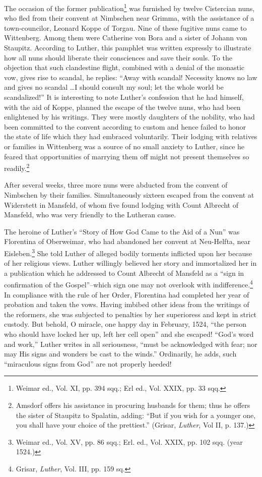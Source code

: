 The occasion of the former publication\footnote
{Weimar ed., Vol. XI, pp. 394 sqq.; Erl ed., Vol. XXIX, pp. 33 sqq.}
was furnished by twelve
Cistercian nuns, who fled from their convent at Nimbschen near
Grimma, with the assistance of a town-councilor, Leonard Koppe of
Torgau. Nine of these fugitive nuns came to Wittenberg. Among
them were Catherine von Bora and a sister of Johann von Staupitz.
According to Luther, this pamphlet was written expressly to illustrate
how all nuns should liberate their consciences and save their
souls. To the objection that such clandestine flight, combined with
a denial of the monastic vow, gives rise to scandal, he replies: “Away
with scandal! Necessity knows no law and gives no scandal \dots I
should consult my soul; let the whole world be scandalized!” It
is interesting to note Luther’s confession that he had himself, with
the aid of Koppe, planned the escape of the twelve nuns, who had
been enlightened by his writings. They were mostly daughters of
the nobility, who had been committed to the convent according to
custom and hence failed to honor the state of life which they had
embraced voluntarily. Their lodging with relatives or families in
Wittenberg was a source of no small anxiety to Luther, since he
feared that opportunities of marrying them off might not present
themselves so readily.\footnote
{Amsdorf offers his assistance in procuring husbands for them; thus he offers the sister
of Staupitz to Spalatin, adding: “But if you wish for a younger one, you shall have your
choice of the prettiest.” (Grisar, \textit{Luther}, Vol II, p. 137.)}

After several weeks, three more nuns were abducted from the
convent of Nimbschen by their families. Simultaneously sixteen
escaped from the convent at Widerstett in Mansfeld, of whom five
found lodging with Count Albrecht of Mansfeld, who was very
friendly to the Lutheran cause.

The heroine of Luther’s “Story of How God Came to the Aid of
a Nun” was Florentina of Oberweimar, who had abandoned her
convent at Neu-Helfta, near Eisleben.\footnote{Weimar ed., Vol. XV, pp. 86 sqq.; Erl. ed., Vol. XXIX, pp. 102 sqq. (year 1524.)}
She told Luther of alleged
bodily torments inflicted upon her because of her religious views.
Luther willingly believed her story and immortalized her in a publication
which he addressed to Count Albrecht of Mansfeld as a “sign
in confirmation of the Gospel”--which sign one may not overlook
with indifference.\footnote{Grisar, \textit{Luther}, Vol. III, pp. 159 sq.}
In compliance with the rule of her Order,
Florentina had completed her year of probation and taken the vows.
Having imbibed other ideas from the writings of the reformers,
she was subjected to penalties by her superioress and kept in strict
custody. But behold, O miracle, one happy day in February, 1524,
“the person who should have locked her up, left her cell open” and
she escaped! “God’s word and work,” Luther writes in all seriousness,
“must be acknowledged with fear; nor may His signs and
wonders be cast to the winds.” Ordinarily, he adds, such “miraculous
signs from God” are not properly heeded!

